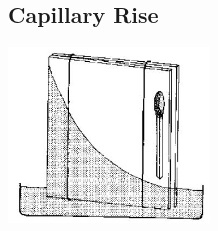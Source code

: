 \begin{multicols}{2}

\columnbreak

\subsection{Capillary Rise}

\begin{center}
\includegraphics[width=0.4\textwidth]{./img/source/capillary-glass.jpg}
\end{center}


\end{multicols}
